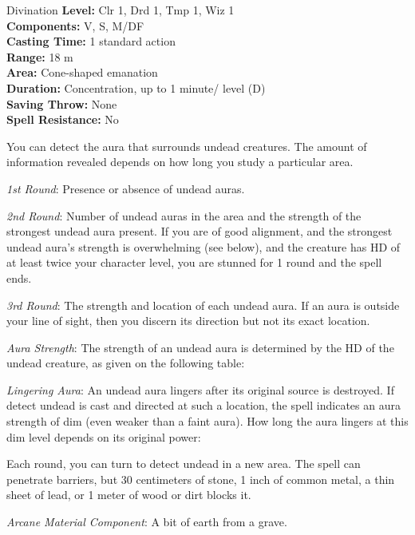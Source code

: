 {Divination}
{
	\textbf{Level:}
	Clr 1, Drd 1, Tmp 1, Wiz 1\\
	\textbf{Components:}
	V, S, M/DF\\
	\textbf{Casting Time:}
	1 standard action\\
	\textbf{Range:}
	18 m\\
	\textbf{Area:}
	Cone-shaped emanation\\
	\textbf{Duration:}
	Concentration, up to 1 minute/ level (D)\\
	\textbf{Saving Throw:}
	None\\
	\textbf{Spell Resistance:}
	No\\
}
{
	You can detect the aura that surrounds undead creatures. The amount of information revealed depends on how long you study a particular area.

	\textit{1st Round}:
	Presence or absence of undead auras.

	\textit{2nd Round}:
	Number of undead auras in the area and the strength of the strongest undead aura present. If you are of good alignment, and the strongest undead aura's strength is overwhelming (see below), and the creature has HD of at least twice your character level, you are stunned for 1 round and the spell ends.

	\textit{3rd Round}:
	The strength and location of each undead aura. If an aura is outside your line of sight, then you discern its direction but not its exact location.

	\textit{Aura Strength}:
	The strength of an undead aura is determined by the HD of the undead creature, as given on the following table:


	\textit{Lingering Aura}:
	An undead aura lingers after its original source is destroyed. If detect undead is cast and directed at such a location, the spell indicates an aura strength of dim (even weaker than a faint aura). How long the aura lingers at this dim level depends on its original power:


	Each round, you can turn to detect undead in a new area. The spell can penetrate barriers, but 30 centimeters of stone, 1 inch of common metal, a thin sheet of lead, or 1 meter of wood or dirt blocks it.

	\textit{Arcane Material Component}:
	A bit of earth from a grave.

}
